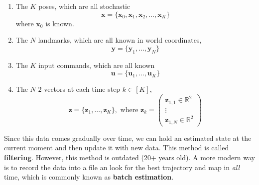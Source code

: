 \documentclass{article}
\begin{document}
  \begin{enumerate}
      \item The $K$ poses, which are all stochastic
      \begin{equation}
        \mathbf{x} = \{\mathbf{x}_0, \mathbf{x}_1, \mathbf{x}_2, \ldots, \mathbf{x}_K\}
      \end{equation}
      where $\mathbf{x}_0$ is known. 
      \item The $N$ landmarks, which are all known in world coordinates, 
      \begin{equation}
        \mathbf{y} = \{ \mathbf{y}_1, \ldots, \mathbf{y}_N\}
      \end{equation}
      
      \item The $K$ input commands, which are all known
      \begin{equation}
        \mathbf{u} = \{\mathbf{u}_1, \ldots, \mathbf{u}_K\}
      \end{equation}
      
      \item The $N$ $2$-vectors at each time step $k \in [K]$, 
      \begin{equation}
        \mathbf{z} = \{\mathbf{z}_1, \ldots, \mathbf{z}_K\}, \text{ where } \mathbf{z}_k = \begin{pmatrix} \mathbf{z}_{1, 1} \in \mathbb{R}^2 \\ \vdots \\ \mathbf{z}_{1, N} \in \mathbb{R}^2 \end{pmatrix}
      \end{equation}
  \end{enumerate}

  Since this data comes gradually over time, we can hold an estimated state at the current moment and then update it with new data. This method is called \textbf{filtering}. However, this method is outdated (20+ years old). A more modern way is to record the data into a file an look for the best trajectory and map in \textit{all} time, which is commonly known as \textbf{batch estimation}. 
\end{document}
